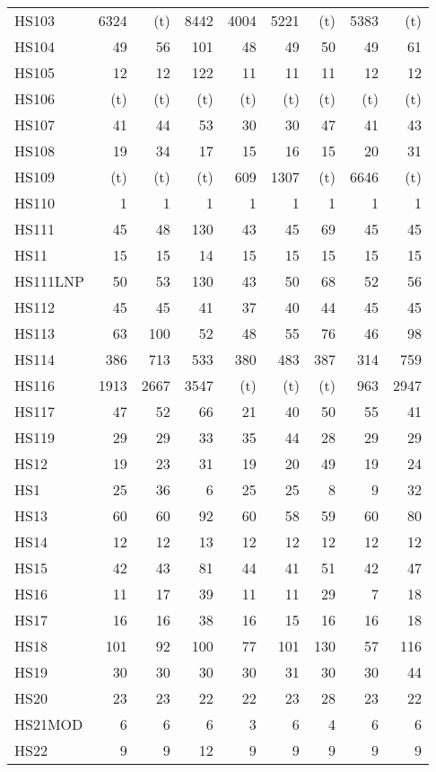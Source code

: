 \documentclass[11pt,twoside]{article}
\begin{document}
{\begin{longtable}[c]{|l|r|r|r|r|r|r|r|r|}
 HS103 & 6324 & (t) & 8442 & 4004 & 5221 & (t) & 5383 & (t) \\
 HS104 & 49 & 56 & 101 & 48 & 49 & 50 & 49 & 61 \\
 HS105 & 12 & 12 & 122 & 11 & 11 & 11 & 12 & 12 \\
 HS106 & (t) & (t) & (t) & (t) & (t) & (t) & (t) & (t) \\
 HS107 & 41 & 44 & 53 & 30 & 30 & 47 & 41 & 43 \\
 HS108 & 19 & 34 & 17 & 15 & 16 & 15 & 20 & 31 \\
 HS109 & (t) & (t) & (t) & 609 & 1307 & (t) & 6646 & (t) \\
 HS110 & 1 & 1 & 1 & 1 & 1 & 1 & 1 & 1 \\
 HS111 & 45 & 48 & 130 & 43 & 45 & 69 & 45 & 45 \\
 HS11 & 15 & 15 & 14 & 15 & 15 & 15 & 15 & 15 \\
 HS111LNP & 50 & 53 & 130 & 43 & 50 & 68 & 52 & 56 \\
 HS112 & 45 & 45 & 41 & 37 & 40 & 44 & 45 & 45 \\
 HS113 & 63 & 100 & 52 & 48 & 55 & 76 & 46 & 98 \\
 HS114 & 386 & 713 & 533 & 380 & 483 & 387 & 314 & 759 \\
 HS116 & 1913 & 2667 & 3547 & (t) & (t) & (t) & 963 & 2947 \\
 HS117 & 47 & 52 & 66 & 21 & 40 & 50 & 55 & 41 \\
 HS119 & 29 & 29 & 33 & 35 & 44 & 28 & 29 & 29 \\
 HS12 & 19 & 23 & 31 & 19 & 20 & 49 & 19 & 24 \\
 HS1 & 25 & 36 & 6 & 25 & 25 & 8 & 9 & 32 \\
 HS13 & 60 & 60 & 92 & 60 & 58 & 59 & 60 & 80 \\
 HS14 & 12 & 12 & 13 & 12 & 12 & 12 & 12 & 12 \\
 HS15 & 42 & 43 & 81 & 44 & 41 & 51 & 42 & 47 \\
 HS16 & 11 & 17 & 39 & 11 & 11 & 29 & 7 & 18 \\
 HS17 & 16 & 16 & 38 & 16 & 15 & 16 & 16 & 18 \\
 HS18 & 101 & 92 & 100 & 77 & 101 & 130 & 57 & 116 \\
 HS19 & 30 & 30 & 30 & 30 & 31 & 30 & 30 & 44 \\
 HS20 & 23 & 23 & 22 & 22 & 23 & 28 & 23 & 22 \\
 HS21MOD & 6 & 6 & 6 & 3 & 6 & 4 & 6 & 6 \\
 HS22 & 9 & 9 & 12 & 9 & 9 & 9 & 9 & 9 \\

\end{longtable}}
\end{document}
